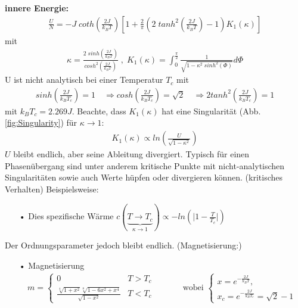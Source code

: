 \documentclass[12pt]{article}
\begin{document}
\textbf{innere Energie:}
\begin{align}
\frac{U}{N}= - J \; coth\left( \frac{2J}{k_BT}\right) \left[ 1 + \frac{2}{\pi} \left( 2 \; tanh^2 \left( \frac{2J}{k_BT} \right) - 1 \right) K_1(\kappa ) \right]
\end{align}
mit
\begin{align}
\kappa= \frac{2 \; sinh \left( \frac{2J}{k_BT} \right)}{cosh^2 \left( \frac{2J}{k_BT} \right) } \; , \; K_1(\kappa)= \int_0^\frac{\pi}{2} \frac{1}{\sqrt{1- \kappa^2 \; sinh^2(\Phi)}} d\Phi
\end{align}
U ist nicht analytisch bei einer Temperatur $T_c$ mit 
\begin{align*}
sinh \left(\frac{2J}{k_BT_c} \right) = 1\quad \Rightarrow cosh \left(\frac{2J}{k_BT_c} \right)= \sqrt{2} \quad \Rightarrow 2 tanh^2\left( \frac{2J}{k_B T_c}\right) =1
\end{align*}
 mit $k_B T_c = 2.269 J$.
 Beachte, dass $K_1(\kappa)$ hat eine Singularität (Abb. \ref{fig:Singularity}) für $\kappa \to 1$:
 \begin{align*}
 K_1(\kappa) \propto  ln \left(\frac{U}{\sqrt{1-\kappa^2}} \right)
 \end{align*}
 $U$ bleibt endlich, aber seine Ableitung divergiert. Typisch für einen Phasenübergang sind unter anderem kritische Punkte mit nicht-analytischen Singularitäten sowie auch Werte hüpfen oder divergieren können. (kritisches Verhalten) Beispielsweise:
\begin{itemize}
\item[•] Dies spezifische Wärme $c(\underbrace{T \to T_c}_{\kappa \to 1}) \propto - ln \left(\vert 1- \frac{T}{T_c}\vert \right)$
\end{itemize}
Der Ordnungsparameter jedoch bleibt endlich. (Magnetisierung:)
\begin{itemize}
\item[•] Magnetisierung 
\begin{align}
m=
\begin{cases}
0 & T>T_c \\
\frac{\sqrt[4]{1+x^2} \sqrt[8]{1-6x^2 +x^4} }{\sqrt{1-x^2}}& T<T_c
\end{cases} \quad \quad \quad \mbox{ wobei } 
\begin{cases}
x= e^{- \frac{2J}{k_B T}}, \\
 x_c=  e^{- \frac{2J}{k_B T_c}} = \sqrt{2} -1
 \end{cases}
\end{align}
\end{itemize}
\end{document}
